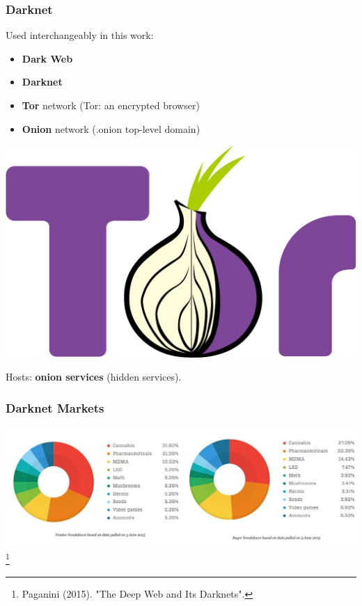 \documentclass[t,xcolor={svgnames,table}]{beamer}
\begin{document}
\begin{frame}
	\frametitle{Darknet}
	
	Used interchangeably in this work:
	\vfill
	
	\begin{minipage}{.6\pagewidth}
	\begin{itemize}\setlength\itemsep{1em}
	\item \textbf{Dark Web}
	\item \textbf{Darknet}
	\item \textbf{Tor} network (Tor: an encrypted browser)
	\item \textbf{Onion} network (.onion top-level domain)
	\end{itemize}
	\end{minipage}
	\begin{minipage}{.3\pagewidth}
	\includegraphics[width=.3\pagewidth]{Tor.png}
	\end{minipage}
	\vfill
	
	Hosts: \textbf{onion services} (hidden services).
\end{frame}

\begin{frame}
	\frametitle{Darknet Markets}
	
	\includegraphics[trim={0 2cm 16cm 1cm},clip,width=\pagewidth]{DeepWeb-Black-markets-vendors-buyers.jpg}\footnote{Paganini (2015). "The Deep Web and Its Darknets".}
\end{frame}
\end{document}
